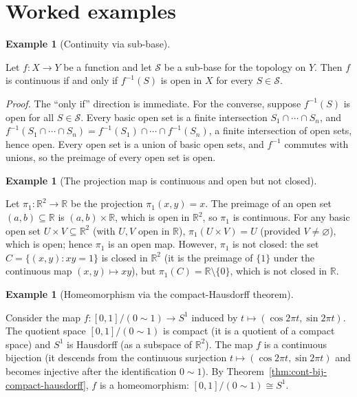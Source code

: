 \documentclass[11pt,a4paper,twoside]{book}
\theoremstyle{remark}
\theoremstyle{definition}
\newtheorem{exampleplain}[theorem]{Example}
\theoremstyle{definition}
\newenvironment{example}[1][]{%
  \begin{exampleplain}[#1]\itshape
}{%
  \end{exampleplain}
}
\begin{document}
\section{Worked examples}
\label{sec:continuity-worked}

\begin{example}[Continuity via sub-base]
\label{ex:continuity-subbase}
Let $f\colon X\to Y$ be a function and let $\mathscr{S}$ be a sub-base for the
topology on $Y$.  Then $f$ is continuous if and only if $f^{-1}(S)$ is open in
$X$ for every $S\in\mathscr{S}$.

\emph{Proof.}\; The ``only if'' direction is immediate.  For the converse,
suppose $f^{-1}(S)$ is open for all $S\in\mathscr{S}$.  Every basic open set
is a finite intersection $S_1\cap\cdots\cap S_n$, and
$f^{-1}(S_1\cap\cdots\cap S_n)=f^{-1}(S_1)\cap\cdots\cap f^{-1}(S_n)$, a
finite intersection of open sets, hence open.  Every open set is a union of
basic open sets, and $f^{-1}$ commutes with unions, so the preimage of every
open set is open.
\end{example}

\begin{example}[The projection map is continuous and open but not closed]
\label{ex:projection}
Let $\pi_1\colon\mathbb{R}^2\to\mathbb{R}$ be the projection
$\pi_1(x,y)=x$.  The preimage of an open set $(a,b)\subseteq\mathbb{R}$ is
$(a,b)\times\mathbb{R}$, which is open in $\mathbb{R}^2$, so $\pi_1$ is
continuous.  For any basic open set $U\times V\subseteq\mathbb{R}^2$ (with $U,V$
open in $\mathbb{R}$), $\pi_1(U\times V)=U$ (provided $V\neq\varnothing$),
which is open; hence $\pi_1$ is an open map.  However, $\pi_1$ is not closed:
the set $C=\{(x,y):xy=1\}$ is closed in $\mathbb{R}^2$ (it is the preimage
of $\{1\}$ under the continuous map $(x,y)\mapsto xy$), but
$\pi_1(C)=\mathbb{R}\setminus\{0\}$, which is not closed in $\mathbb{R}$.
\end{example}

\begin{example}[Homeomorphism via the compact-Hausdorff theorem]
\label{ex:compact-hausdorff-app}
Consider the map $f\colon[0,1]/(0\sim 1)\to S^1$ induced by
$t\mapsto(\cos 2\pi t,\sin 2\pi t)$.  The quotient space $[0,1]/(0\sim 1)$
is compact (it is a quotient of a compact space) and $S^1$ is Hausdorff
(as a subspace of $\mathbb{R}^2$).  The map $f$ is a continuous bijection (it
descends from the continuous surjection $t\mapsto(\cos 2\pi t,\sin 2\pi t)$
and becomes injective after the identification $0\sim 1$).  By
Theorem~\ref{thm:cont-bij-compact-hausdorff}, $f$ is a homeomorphism:
$[0,1]/(0\sim 1)\cong S^1$.
\end{example}
\end{document}
